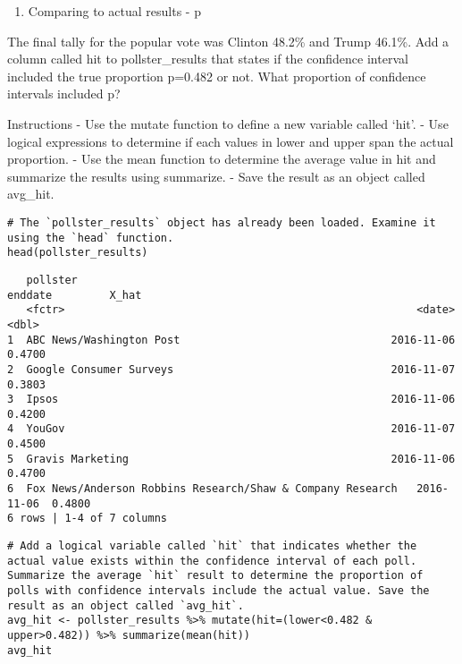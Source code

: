 \documentclass[
]{article}
\providecommand{\tightlist}{%
  \setlength{\itemsep}{0pt}\setlength{\parskip}{0pt}}
\begin{document}
\begin{enumerate}
\def\labelenumi{\arabic{enumi}.}
\setcounter{enumi}{2}
\tightlist
\item
  Comparing to actual results - p
\end{enumerate}

The final tally for the popular vote was Clinton 48.2\% and Trump
46.1\%. Add a column called hit to pollster\_results that states if the
confidence interval included the true proportion p=0.482 or not. What
proportion of confidence intervals included p?

Instructions - Use the mutate function to define a new variable called
`hit'. - Use logical expressions to determine if each values in lower
and upper span the actual proportion. - Use the mean function to
determine the average value in hit and summarize the results using
summarize. - Save the result as an object called avg\_hit.

\begin{verbatim}
# The `pollster_results` object has already been loaded. Examine it using the `head` function.
head(pollster_results)
\end{verbatim}

\begin{verbatim}
   pollster                                                     enddate         X_hat
   <fctr>                                                       <date>          <dbl>
1  ABC News/Washington Post                                 2016-11-06  0.4700  
2  Google Consumer Surveys                                  2016-11-07  0.3803  
3  Ipsos                                                    2016-11-06  0.4200  
4  YouGov                                                   2016-11-07  0.4500  
5  Gravis Marketing                                         2016-11-06  0.4700  
6  Fox News/Anderson Robbins Research/Shaw & Company Research   2016-11-06  0.4800  
6 rows | 1-4 of 7 columns
\end{verbatim}

\begin{verbatim}
# Add a logical variable called `hit` that indicates whether the actual value exists within the confidence interval of each poll. Summarize the average `hit` result to determine the proportion of polls with confidence intervals include the actual value. Save the result as an object called `avg_hit`.
avg_hit <- pollster_results %>% mutate(hit=(lower<0.482 & upper>0.482)) %>% summarize(mean(hit))
avg_hit
\end{verbatim}
\end{document}
